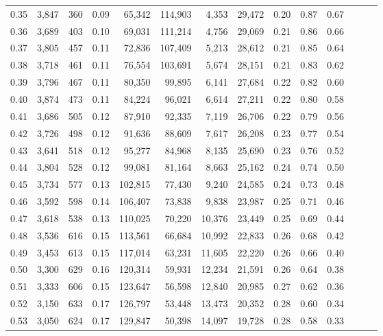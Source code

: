 \begin{tabular}{rrrrrrrrrrrrrr}
0.35 &  3,847 &  360 &  0.09 &   65,342 &  114,903 &   4,353 &  29,472 &  0.20 &  0.87 &      0.67 \\
0.36 &  3,689 &  403 &  0.10 &   69,031 &  111,214 &   4,756 &  29,069 &  0.21 &  0.86 &      0.66 \\
0.37 &  3,805 &  457 &  0.11 &   72,836 &  107,409 &   5,213 &  28,612 &  0.21 &  0.85 &      0.64 \\
0.38 &  3,718 &  461 &  0.11 &   76,554 &  103,691 &   5,674 &  28,151 &  0.21 &  0.83 &      0.62 \\
0.39 &  3,796 &  467 &  0.11 &   80,350 &   99,895 &   6,141 &  27,684 &  0.22 &  0.82 &      0.60 \\
0.40 &  3,874 &  473 &  0.11 &   84,224 &   96,021 &   6,614 &  27,211 &  0.22 &  0.80 &      0.58 \\
0.41 &  3,686 &  505 &  0.12 &   87,910 &   92,335 &   7,119 &  26,706 &  0.22 &  0.79 &      0.56 \\
0.42 &  3,726 &  498 &  0.12 &   91,636 &   88,609 &   7,617 &  26,208 &  0.23 &  0.77 &      0.54 \\
0.43 &  3,641 &  518 &  0.12 &   95,277 &   84,968 &   8,135 &  25,690 &  0.23 &  0.76 &      0.52 \\
0.44 &  3,804 &  528 &  0.12 &   99,081 &   81,164 &   8,663 &  25,162 &  0.24 &  0.74 &      0.50 \\
0.45 &  3,734 &  577 &  0.13 &  102,815 &   77,430 &   9,240 &  24,585 &  0.24 &  0.73 &      0.48 \\
0.46 &  3,592 &  598 &  0.14 &  106,407 &   73,838 &   9,838 &  23,987 &  0.25 &  0.71 &      0.46 \\
0.47 &  3,618 &  538 &  0.13 &  110,025 &   70,220 &  10,376 &  23,449 &  0.25 &  0.69 &      0.44 \\
0.48 &  3,536 &  616 &  0.15 &  113,561 &   66,684 &  10,992 &  22,833 &  0.26 &  0.68 &      0.42 \\
0.49 &  3,453 &  613 &  0.15 &  117,014 &   63,231 &  11,605 &  22,220 &  0.26 &  0.66 &      0.40 \\
0.50 &  3,300 &  629 &  0.16 &  120,314 &   59,931 &  12,234 &  21,591 &  0.26 &  0.64 &      0.38 \\
0.51 &  3,333 &  606 &  0.15 &  123,647 &   56,598 &  12,840 &  20,985 &  0.27 &  0.62 &      0.36 \\
0.52 &  3,150 &  633 &  0.17 &  126,797 &   53,448 &  13,473 &  20,352 &  0.28 &  0.60 &      0.34 \\
0.53 &  3,050 &  624 &  0.17 &  129,847 &   50,398 &  14,097 &  19,728 &  0.28 &  0.58 &      0.33 \\

\end{tabular}
